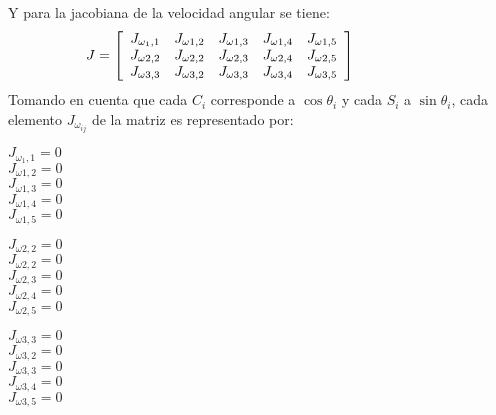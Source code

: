 Y para la jacobiana de la velocidad angular se tiene:
\begin{equation*}
    \hspace{-10mm}
    J = \left[
        \begin{array}{ccccc}
            J_{\omega_1 ,1} & J_{\omega1 ,2} & J_{\omega1 ,3} & J_{\omega1 ,4} & J_{\omega1 ,5}\\
            J_{\omega2 ,2} & J_{\omega2 ,2} & J_{\omega2 ,3} & J_{\omega2 ,4} & J_{\omega2 ,5}\\
            J_{\omega3 ,3 } & J_{\omega3,2} & J_{\omega3 ,3} & J_{\omega3 ,4} & J_{\omega3 ,5}\\
        \end{array}\right] 
        \hspace{10mm}
\end{equation*} 
\noindent Tomando en cuenta que cada $C_i$ corresponde a $\cos \theta_i$ y cada $S_i$ a $\sin \theta_i$, cada elemento
$J_{\omega_{ij}}$ de la matriz es representado por:
\begin{flushleft}
    \(J_{\omega_1 ,1} = 0 \)\\ \vspace{0.25cm}
    \(J_{\omega1 ,2} = 0\) \\ \vspace{0.25cm}
    \(J_{\omega1 ,3} = 0\) \\ \vspace{0.25cm}
    \(J_{\omega1 ,4} = 0\) \\ \vspace{0.25cm}
    \(J_{\omega1 ,5} = 0\) \\ \vspace{0.25cm}
\end{flushleft}

\begin{flushleft}
    \(J_{\omega2 ,2} = 0 \) \\ \vspace{0.25cm}
    \(J_{\omega2 ,2} = 0\) \\ \vspace{0.25cm}
    \(J_{\omega2 ,3} =0\) \\ \vspace{0.25cm}
    \(J_{\omega2 ,4} =0\) \\ \vspace{0.25cm}
    \(J_{\omega2 ,5 } =0\) \\ \vspace{0.25cm}
\end{flushleft}

\begin{flushleft}
    \(J_{\omega3 ,3} = 0 \) \\ \vspace{0.25cm}
    \(J_{\omega3, 2} = 0 \) \\ \vspace{0.25cm}
    \(J_{\omega3 ,3} = 0 \) \\ \vspace{0.25cm}
    \(J_{\omega3 ,4} = 0 \) \\ \vspace{0.25cm}
    \(J_{\omega3 ,5} = 0\) \\ \vspace{0.25cm}
\end{flushleft}    

